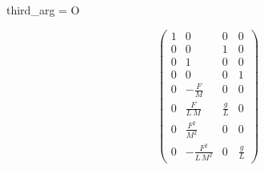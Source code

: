 third_arg = O

\begin{equation}
\left(\begin{array}{cccc} 1 & 0 & 0 & 0\\ 0 & 0 & 1 & 0\\ 0 & 1 & 0 & 0\\ 0 & 0 & 0 & 1\\ 0 & -\frac{F}{M} & 0 & 0\\ 0 & \frac{F}{L\,M} & \frac{g}{L} & 0\\ 0 & \frac{F^2}{M^2} & 0 & 0\\ 0 & -\frac{F^2}{L\,M^2} & 0 & \frac{g}{L} \end{array}\right)
\end{equation}
